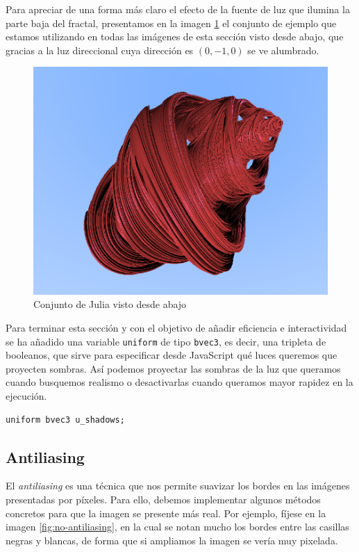 Para apreciar de una forma más claro el efecto de la fuente de luz que ilumina la parte baja del fractal, presentamos en la imagen \ref{fig:desde-abajo} el conjunto de ejemplo que estamos utilizando en todas las imágenes de esta sección visto desde abajo, que gracias a la luz direccional cuya dirección es $(0,-1,0)$ se ve alumbrado.

\begin{figure} [ht]
    \centering
    \includegraphics[scale = 0.45]{img/C8/desde-abajo.png}
    \caption{Conjunto de Julia visto desde abajo}
    \label{fig:desde-abajo}
\end{figure}

Para terminar esta sección y con el objetivo de añadir eficiencia e interactividad se ha añadido una variable \verb|uniform| de tipo \verb|bvec3|, es decir, una tripleta de booleanos, que sirve para especificar desde JavaScript qué luces queremos que proyecten sombras. Así podemos proyectar las sombras de la luz que queramos cuando busquemos realismo o desactivarlas cuando queramos mayor rapidez en la ejecución.

\begin{lstlisting}
uniform bvec3 u_shadows;
\end{lstlisting}


\subsection{Antiliasing}

El \textit{antiliasing} es una técnica que nos permite suavizar los bordes en las imágenes presentadas por píxeles. Para ello, debemos implementar algunos métodos concretos para que la imagen se presente más real. Por ejemplo, fíjese en la imagen \ref{fig:no-antiliasing}, en la cual se notan mucho los bordes entre las casillas negras y blancas, de forma que si ampliamos la imagen se vería muy pixelada.

